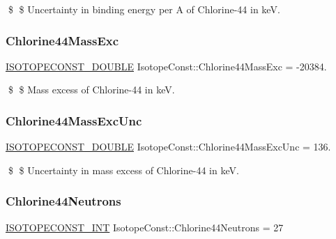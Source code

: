 \$ \$ Uncertainty in binding energy per A of Chlorine-\/44 in keV. \mbox{\label{group___isotope_const-_chlorine-_cl44_gaa587de9101ef5c66590505f061ef2b72}} 
\subsubsection{\texorpdfstring{Chlorine44\+Mass\+Exc}{Chlorine44MassExc}}
{\footnotesize\ttfamily \mbox{\hyperlink{group___isotope_const-_macros_ga8f45a7272ce02c0b4c65c44636ed719a}{I\+S\+O\+T\+O\+P\+E\+C\+O\+N\+S\+T\+\_\+\+D\+O\+U\+B\+LE}} Isotope\+Const\+::\+Chlorine44\+Mass\+Exc = -\/20384.}

\$ \$ Mass excess of Chlorine-\/44 in keV. \mbox{\label{group___isotope_const-_chlorine-_cl44_gae7bbedf767f9d22c32701991a8b33af4}} 
\subsubsection{\texorpdfstring{Chlorine44\+Mass\+Exc\+Unc}{Chlorine44MassExcUnc}}
{\footnotesize\ttfamily \mbox{\hyperlink{group___isotope_const-_macros_ga8f45a7272ce02c0b4c65c44636ed719a}{I\+S\+O\+T\+O\+P\+E\+C\+O\+N\+S\+T\+\_\+\+D\+O\+U\+B\+LE}} Isotope\+Const\+::\+Chlorine44\+Mass\+Exc\+Unc = 136.}

\$ \$ Uncertainty in mass excess of Chlorine-\/44 in keV. \mbox{\label{group___isotope_const-_chlorine-_cl44_gab5af3b7878aeaf1733219e142bac1d2c}} 
\subsubsection{\texorpdfstring{Chlorine44\+Neutrons}{Chlorine44Neutrons}}
{\footnotesize\ttfamily \mbox{\hyperlink{group___isotope_const-_macros_ga5f18360b3e99483a35c32d789e62621c}{I\+S\+O\+T\+O\+P\+E\+C\+O\+N\+S\+T\+\_\+\+I\+NT}} Isotope\+Const\+::\+Chlorine44\+Neutrons = 27}

